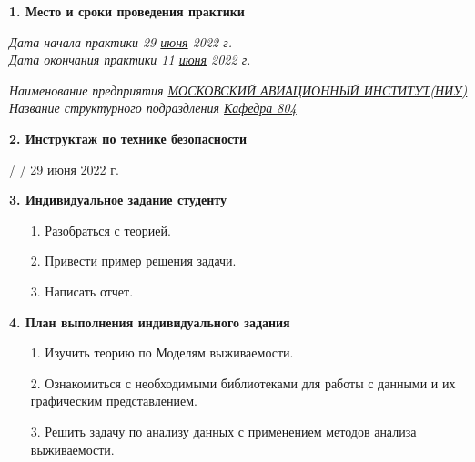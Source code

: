 \textbf{1. Место и сроки проведения практики}

\vspace{20pt}

{\em Дата начала практики \hspace{3cm} 29 \underline{июня} 2022 г.} \\

{\em Дата окончания практики \hspace{3cm} 11 \underline{июня} 2022 г.}

\vspace{20pt}

{\em Наименование предприятия \underline{МОСКОВСКИЙ АВИАЦИОННЫЙ ИНСТИТУТ(НИУ)}} \\

{\em Название структурного подраздления \underline{Кафедра 804}}

\vspace{20pt}

\textbf{2. Инструктаж по технике безопасности}

\vspace{10pt}

\underline{ \hspace{3cm} / \hspace{3cm} /} \hspace{1cm} 29 \underline{июня} 2022 г.

\vspace{10pt}

\textbf{3. Индивидуальное задание студенту}

\begin{itemize}
    \item[1.] Разобраться с теорией. 
    \item[2.] Привести пример решения задачи. 
    \item[3.] Написать отчет.
\end{itemize}

\vspace{10pt}

\textbf{4. План выполнения индивидуального задания}

\begin{itemize}
    \item[1.] Изучить теорию по Моделям выживаемости.
    \item[2.] Ознакомиться с необходимыми библиотеками для работы с данными и их графическим представлением.
    \item[3.] Решить задачу по анализу данных с применением методов анализа выживаемости. 
\end{itemize}

